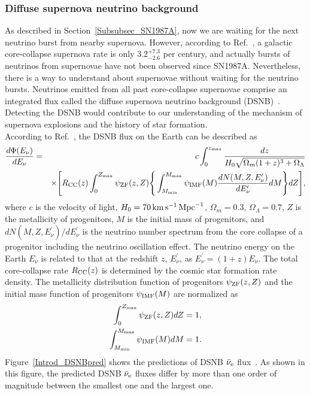 \subsubsection{Diffuse supernova neutrino background}
\vs\hs
As described in Section~\ref{Subsubsec_SN1987A}, now we are waiting for the next neutrino burst from nearby supernova.
However, according to Ref.~\cite{2013Adams}, a galactic core-collapse supernova rate is only $3.2^{+7.3}_{-2.6}$ per century, and actually bursts of neutrinos from supernovae have not been observed since SN1987A.
Nevertheless, there is a way to understand about supernovae without waiting for the neutrino bursts.
Neutrinos emitted from all past core-collapse supernovae comprise an integrated flux called the diffuse supernova neutrino background (DSNB)~\cite{2010Beacom}.
Detecting the DSNB would contribute to our understanding of the mechanism of supernova explosions and the history of star formation.\\
\hs
According to Ref.~\cite{2015Nakazato}, the DSNB flux on the Earth can be described as
\begin{eqnarray}
	{d\Phi(E_{\nu}) \over dE_{\nu}} &=& c\int_{0}^{z_{\rm max}} {dz \over H_{0}\sqrt{\Omega_{m}(1 + z)^{3} + \Omega_{\Lambda}}} \nonumber \\
	                                & & \times\Bigg[R_{\rm CC}(z)\int_{0}^{Z_{\rm max}} \psi_{\rm ZF}(z, Z)\Bigg\{\int_{M_{\rm min}}^{M_{\rm max}} \psi_{\rm IMF}(M){dN(M, Z, E^{\prime}_{\nu}) \over dE^{\prime}_{\nu}}dM\Bigg\}dZ\Bigg],
\end{eqnarray}
where $c$ is the velocity of light, $H_{0} = 70\,{\rm km}\,{\rm s}^{-1}\,{\rm Mpc}^{-1}$, $\Omega_{m} = 0.3$, $\Omega_{\Lambda} = 0.7$, $Z$ is the metallicity of progenitors, $M$ is the initial mass of progenitors, and $dN(M, Z, E^{\prime}_{\nu})/dE^{\prime}_{\nu}$ is the neutrino number spectrum from the core collapse of a progenitor including the neutrino oscillation effect.
The neutrino energy on the Earth $E_{\nu}$ is related to that at the redshift $z$, $E^{\prime}_{\nu}$, as $E^{\prime}_{\nu} = (1 + z)E_{\nu}$.
The total core-collapse rate $R_{\rm CC}(z)$ is determined by the cosmic star formation rate density.
The metallicity distribution function of progenitors $\psi_{\rm ZF}(z, Z)$ and the initial mass function of progenitors $\psi_{\rm IMF}(M)$ are normalized as
\begin{eqnarray}
	\int_{0}^{Z_{\rm max}} \psi_{\rm ZF}(z, Z)dZ = 1, \\
	\int_{M_{\rm min}}^{M_{\rm max}} \psi_{\rm IMF}(M)dM = 1.
\end{eqnarray}
Figure~\ref{Introd_DSNBpred} shows the predictions of DSNB $\bar{\nu}_{\rm e}$ flux~\cite{2021Abe}.
As shown in this figure, the predicted DSNB $\bar{\nu}_{\rm e}$ fluxes differ by more than one order of magnitude between the smallest one and the largest one.


